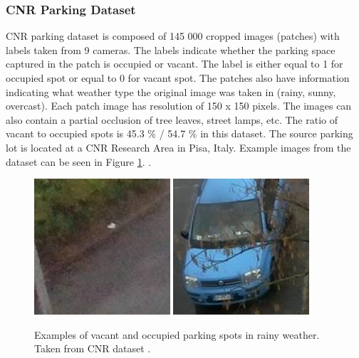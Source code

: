 \documentclass[thesis=M,english]{FITthesis}[2019/03/06]
\begin{document}
\subsubsection{CNR Parking Dataset}
CNR parking dataset is composed of 145 000 cropped images (patches) with labels taken from 9 cameras. The labels indicate whether the parking space captured in the patch is occupied or vacant. The label is  either equal to 1 for occupied spot or equal to 0 for vacant spot. The patches also have information indicating what weather type the original image was taken in (rainy, sunny, overcast). Each patch image has resolution of 150 x 150 pixels. The images can also contain a partial occlusion of tree leaves, street lamps, etc. The ratio of vacant to occupied spots is 45.3 \% / 54.7 \% in this dataset. The source parking lot is located at a CNR Research Area in Pisa, Italy. Example images from the dataset can be seen in Figure \ref{label:cnr_dataset_exampls}. \cite{cit:cnr_dataset}.
\begin{figure}[ht]
	\centering
	\includegraphics[width=0.45\textwidth]{imgs/cnr-vacant.jpg}
	\includegraphics[width=0.45\textwidth]{imgs/cnr-occupied.jpg}
	\caption{Examples of vacant and occupied parking spots in rainy weather. Taken from CNR dataset \cite{cit:cnr_dataset}.}
	\label{label:cnr_dataset_exampls}
\end{figure}
\end{document}
